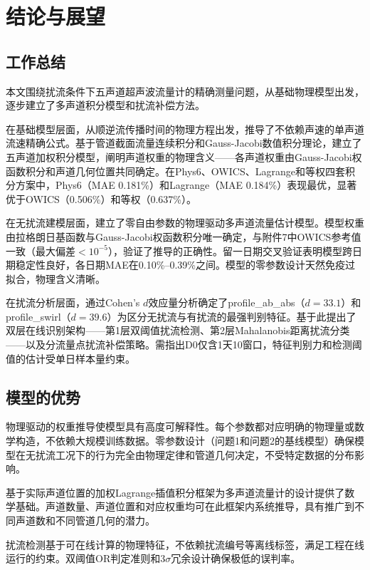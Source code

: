 \section{结论与展望}

\subsection{工作总结}

本文围绕扰流条件下五声道超声波流量计的精确测量问题，从基础物理模型出发，逐步建立了多声道积分模型和扰流补偿方法。

在基础模型层面，从顺逆流传播时间的物理方程出发，推导了不依赖声速的单声道流速精确公式。基于管道截面流量连续积分和Gauss-Jacobi数值积分理论，建立了五声道加权积分模型，阐明声道权重的物理含义——各声道权重由Gauss-Jacobi权函数积分和声道几何位置共同确定。在Phys6、OWICS、Lagrange和等权四套积分方案中，Phys6（MAE 0.181\%）和Lagrange（MAE 0.184\%）表现最优，显著优于OWICS（0.506\%）和等权（0.637\%）。

在无扰流建模层面，建立了零自由参数的物理驱动多声道流量估计模型。模型权重由拉格朗日基函数与Gauss-Jacobi权函数积分唯一确定，与附件7中OWICS参考值一致（最大偏差$<10^{-5}$），验证了推导的正确性。留一日期交叉验证表明模型跨日期稳定性良好，各日期MAE在0.10\%--0.39\%之间。模型的零参数设计天然免疫过拟合，物理含义清晰。

在扰流分析层面，通过Cohen's $d$效应量分析确定了profile\_ab\_abs（$d=33.1$）和profile\_swirl（$d=39.6$）为区分无扰流与有扰流的最强判别特征。基于此提出了双层在线识别架构——第1层双阈值扰流检测、第2层Mahalanobis距离扰流分类——以及分流量点扰流补偿策略。需指出D0仅含1天10窗口，特征判别力和检测阈值的估计受单日样本量约束。

\subsection{模型的优势}

物理驱动的权重推导使模型具有高度可解释性。每个参数都对应明确的物理量或数学构造，不依赖大规模训练数据。零参数设计（问题1和问题2的基线模型）确保模型在无扰流工况下的行为完全由物理定律和管道几何决定，不受特定数据的分布影响。

基于实际声道位置的加权Lagrange插值积分框架为多声道流量计的设计提供了数学基础。声道数量、声道位置和对应权重均可在此框架内系统推导，具有推广到不同声道数和不同管道几何的潜力。

扰流检测基于可在线计算的物理特征，不依赖扰流编号等离线标签，满足工程在线运行的约束。双阈值OR判定准则和$3\sigma$冗余设计确保极低的误判率。

